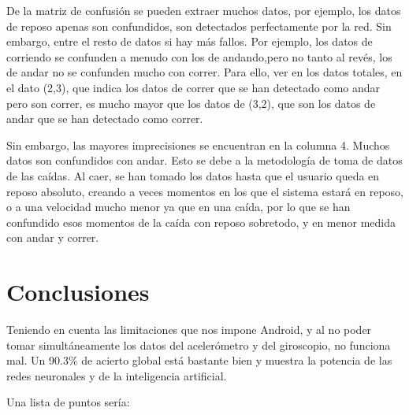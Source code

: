 \documentclass[12pt]{article}
\numberwithin{equation}{section}
\begin{document}
De la matriz de confusión se pueden extraer muchos datos, por ejemplo, los datos de reposo apenas son confundidos, son detectados perfectamente por la red. Sin embargo, entre el resto de datos si hay más fallos. Por ejemplo, los datos de corriendo se confunden a menudo con los de andando,pero no tanto al revés, los de andar no se confunden mucho con correr. Para ello, ver en los datos totales, en el dato (2,3), que indica los datos de correr que se han detectado como andar pero son correr, es mucho mayor que los datos de (3,2), que son los datos de andar que se han detectado como correr.

Sin embargo, las mayores imprecisiones se encuentran en la columna 4. Muchos datos son confundidos con andar. Esto se debe a la metodología de toma de datos de las caídas. Al caer, se han tomado los datos hasta que el usuario queda en reposo absoluto, creando a veces momentos en los que el sistema estará en reposo, o a una velocidad mucho menor ya que en una caída, por lo que se han confundido esos momentos de la caída con reposo sobretodo, y en menor medida con andar y correr.


\newpage
\section{Conclusiones}

Teniendo en cuenta las limitaciones que nos impone Android, y al no poder tomar simultáneamente los datos del acelerómetro y del giroscopio, no funciona mal. Un 90.3\% de acierto global está bastante bien y muestra la potencia de las redes neuronales y de la inteligencia artificial.

Una lista de puntos sería:
\end{document}
